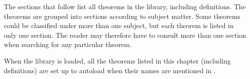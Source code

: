 \label{theorems}

The sections that follow list all theorems in the  library, including
definitions. The theorems are grouped into sections according to subject
matter. Some theorems could be classified under more than one subject, but each
theorem is listed in only one section. The reader may therefore have to consult
more than one section when searching for any particular theorem.

When the  library is loaded, all the theorems listed in this chapter
(including definitions) are set up to autoload when their names are mentioned
in \ML.

